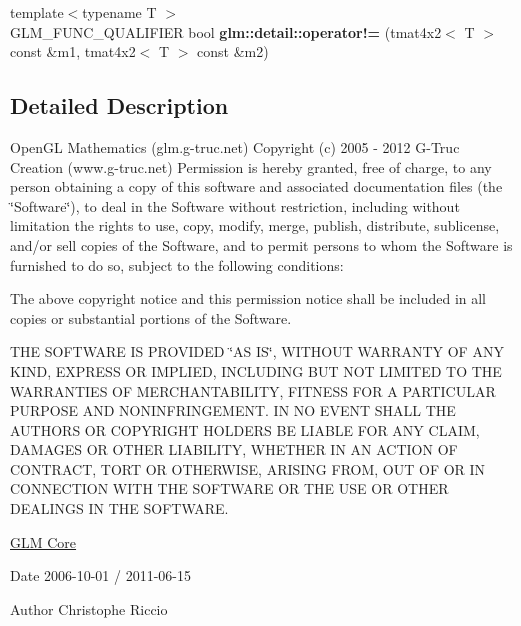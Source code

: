 \begin{DoxyCompactItemize}
\item 
\hypertarget{namespaceglm_1_1detail_a10d1b000b2e24547882c48dc1d479eed}{{\footnotesize template$<$typename T $>$ }\\G\-L\-M\-\_\-\-F\-U\-N\-C\-\_\-\-Q\-U\-A\-L\-I\-F\-I\-E\-R bool {\bfseries glm\-::detail\-::operator!=} (tmat4x2$<$ T $>$ const \&m1, tmat4x2$<$ T $>$ const \&m2)}\label{namespaceglm_1_1detail_a10d1b000b2e24547882c48dc1d479eed}

\end{DoxyCompactItemize}


\subsection{Detailed Description}
Open\-G\-L Mathematics (glm.\-g-\/truc.\-net) Copyright (c) 2005 -\/ 2012 G-\/\-Truc Creation (www.\-g-\/truc.\-net) Permission is hereby granted, free of charge, to any person obtaining a copy of this software and associated documentation files (the \char`\"{}\-Software\char`\"{}), to deal in the Software without restriction, including without limitation the rights to use, copy, modify, merge, publish, distribute, sublicense, and/or sell copies of the Software, and to permit persons to whom the Software is furnished to do so, subject to the following conditions\-:

The above copyright notice and this permission notice shall be included in all copies or substantial portions of the Software.

T\-H\-E S\-O\-F\-T\-W\-A\-R\-E I\-S P\-R\-O\-V\-I\-D\-E\-D \char`\"{}\-A\-S I\-S\char`\"{}, W\-I\-T\-H\-O\-U\-T W\-A\-R\-R\-A\-N\-T\-Y O\-F A\-N\-Y K\-I\-N\-D, E\-X\-P\-R\-E\-S\-S O\-R I\-M\-P\-L\-I\-E\-D, I\-N\-C\-L\-U\-D\-I\-N\-G B\-U\-T N\-O\-T L\-I\-M\-I\-T\-E\-D T\-O T\-H\-E W\-A\-R\-R\-A\-N\-T\-I\-E\-S O\-F M\-E\-R\-C\-H\-A\-N\-T\-A\-B\-I\-L\-I\-T\-Y, F\-I\-T\-N\-E\-S\-S F\-O\-R A P\-A\-R\-T\-I\-C\-U\-L\-A\-R P\-U\-R\-P\-O\-S\-E A\-N\-D N\-O\-N\-I\-N\-F\-R\-I\-N\-G\-E\-M\-E\-N\-T. I\-N N\-O E\-V\-E\-N\-T S\-H\-A\-L\-L T\-H\-E A\-U\-T\-H\-O\-R\-S O\-R C\-O\-P\-Y\-R\-I\-G\-H\-T H\-O\-L\-D\-E\-R\-S B\-E L\-I\-A\-B\-L\-E F\-O\-R A\-N\-Y C\-L\-A\-I\-M, D\-A\-M\-A\-G\-E\-S O\-R O\-T\-H\-E\-R L\-I\-A\-B\-I\-L\-I\-T\-Y, W\-H\-E\-T\-H\-E\-R I\-N A\-N A\-C\-T\-I\-O\-N O\-F C\-O\-N\-T\-R\-A\-C\-T, T\-O\-R\-T O\-R O\-T\-H\-E\-R\-W\-I\-S\-E, A\-R\-I\-S\-I\-N\-G F\-R\-O\-M, O\-U\-T O\-F O\-R I\-N C\-O\-N\-N\-E\-C\-T\-I\-O\-N W\-I\-T\-H T\-H\-E S\-O\-F\-T\-W\-A\-R\-E O\-R T\-H\-E U\-S\-E O\-R O\-T\-H\-E\-R D\-E\-A\-L\-I\-N\-G\-S I\-N T\-H\-E S\-O\-F\-T\-W\-A\-R\-E.

\hyperlink{group__core}{G\-L\-M Core}

\begin{DoxyDate}{Date}
2006-\/10-\/01 / 2011-\/06-\/15 
\end{DoxyDate}
\begin{DoxyAuthor}{Author}
Christophe Riccio 
\end{DoxyAuthor}
